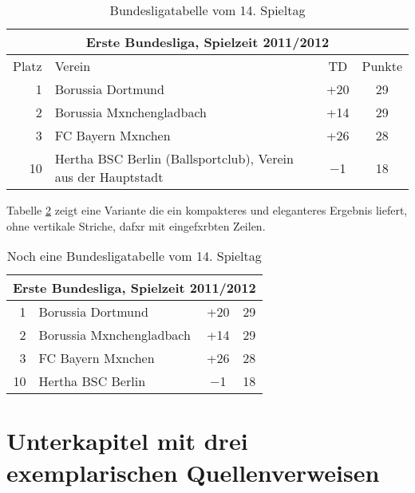 \begin{table}[htp] 
\centering
\begin{tabular}{r|p{6cm}|c|c}  %
\toprule
\multicolumn{4}{c}{\large\bfseries Erste Bundesliga, Spielzeit 2011/2012}\\ \midrule
Platz & Verein & TD & Punkte\\ \midrule
1 & Borussia Dortmund & +20 & 29\\ \midrule
2 & Borussia Mxnchengladbach & +14 & 29\\ \midrule
3 & FC Bayern Mxnchen & +26 & 28\\ \midrule
10 & Hertha BSC Berlin (Ballsportclub), Verein aus der Hauptstadt & $-$1 & 18 \\
\bottomrule
\end{tabular}
\caption{Bundesligatabelle vom 14. Spieltag}\label{t_buli}
\end{table}

Tabelle \ref{t_buli2} zeigt eine Variante die ein kompakteres und eleganteres Ergebnis liefert, ohne vertikale Striche, dafxr mit eingefxrbten Zeilen.

\begin{table}[htp] 
\centering
\begin{tabular}{rlcc}  %
\toprule
\multicolumn{4}{c}{\large\sffamily Erste Bundesliga, Spielzeit 2011/2012}\\ \midrule
1 & Borussia Dortmund & +20 & 29\\ 
2 & Borussia Mxnchengladbach & +14 & 29\\
3 & FC Bayern Mxnchen & +26 & 28\\
10 & Hertha BSC Berlin & $-$1 & 18 \\ \bottomrule
\end{tabular}
\caption{Noch eine Bundesligatabelle vom 14. Spieltag}\label{t_buli2}
\end{table}



\section{Unterkapitel mit drei exemplarischen Quellenverweisen}


